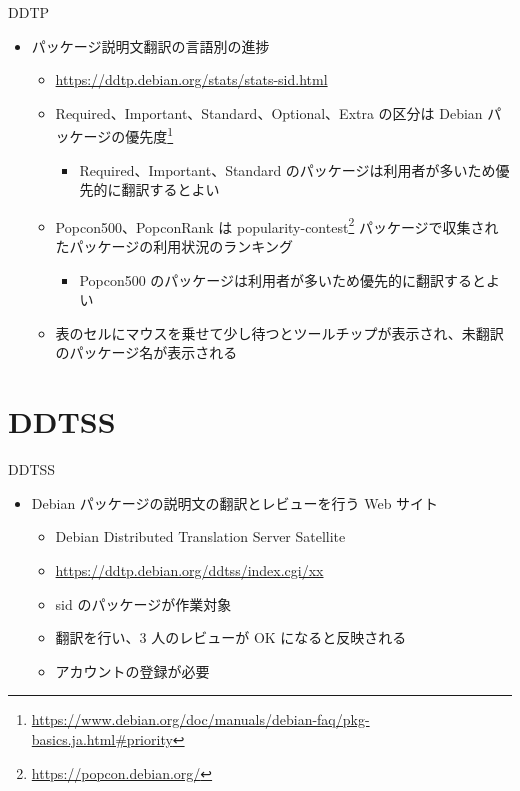 \begin{frame}{DDTP}
  \begin{itemize}
  \item パッケージ説明文翻訳の言語別の進捗
    \begin{itemize}
    \item \url{https://ddtp.debian.org/stats/stats-sid.html}
    \item Required、Important、Standard、Optional、Extra の区分は Debian パッケージの優先度\footnote{\url{https://www.debian.org/doc/manuals/debian-faq/pkg-basics.ja.html\#priority}}
      \begin{itemize}
      \item Required、Important、Standard のパッケージは利用者が多いため優先的に翻訳するとよい
      \end{itemize}
    \item Popcon500、PopconRank は popularity-contest\footnote{\url{https://popcon.debian.org/}} パッケージで収集されたパッケージの利用状況のランキング
      \begin{itemize}
      \item Popcon500 のパッケージは利用者が多いため優先的に翻訳するとよい
      \end{itemize}
    \item 表のセルにマウスを乗せて少し待つとツールチップが表示され、未翻訳のパッケージ名が表示される
    \end{itemize}
  \end{itemize}
\end{frame}


\section{DDTSS}

\begin{frame}{DDTSS}
  \begin{itemize}
  \item Debian パッケージの説明文の翻訳とレビューを行う Web サイト
    \begin{itemize}
    \item Debian Distributed Translation Server Satellite    
    \item \url{https://ddtp.debian.org/ddtss/index.cgi/xx}
    \item sid のパッケージが作業対象
    \item 翻訳を行い、3 人のレビューが OK になると反映される
    \item アカウントの登録が必要
    \end{itemize}
  \end{itemize}
\end{frame}


